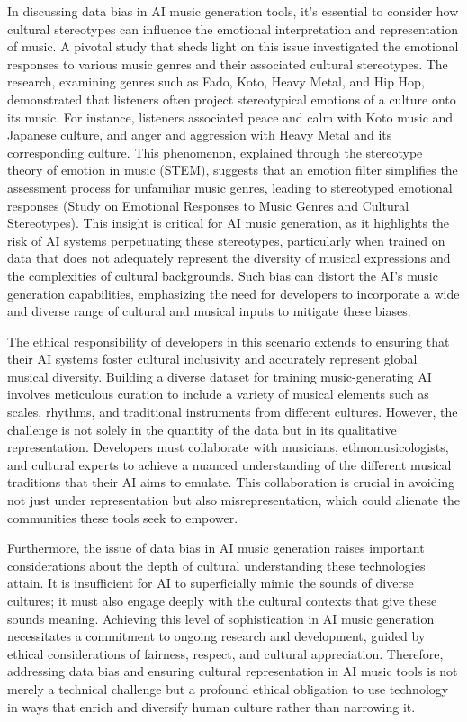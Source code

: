 \documentclass[10pt,twocolumn]{article}
\begin{document}
In discussing data bias in AI music generation tools, it's essential to consider how cultural stereotypes can influence the emotional interpretation and representation of music. A pivotal study \cite{stereotype} that sheds light on this issue investigated the emotional responses to various music genres and their associated cultural stereotypes. The research, examining genres such as Fado, Koto, Heavy Metal, and Hip Hop, demonstrated that listeners often project stereotypical emotions of a culture onto its music. For instance, listeners associated peace and calm with Koto music and Japanese culture, and anger and aggression with Heavy Metal and its corresponding culture. This phenomenon, explained through the stereotype theory of emotion in music (STEM), suggests that an emotion filter simplifies the assessment process for unfamiliar music genres, leading to stereotyped emotional responses (Study on Emotional Responses to Music Genres and Cultural Stereotypes). This insight is critical for AI music generation, as it highlights the risk of AI systems perpetuating these stereotypes, particularly when trained on data that does not adequately represent the diversity of musical expressions and the complexities of cultural backgrounds. Such bias can distort the AI's music generation capabilities, emphasizing the need for developers to incorporate a wide and diverse range of cultural and musical inputs to mitigate these biases.

The ethical responsibility of developers in this scenario extends to ensuring that their AI systems foster cultural inclusivity and accurately represent global musical diversity. Building a diverse dataset for training music-generating AI involves meticulous curation to include a variety of musical elements such as scales, rhythms, and traditional instruments from different cultures. However, the challenge is not solely in the quantity of the data but in its qualitative representation. Developers must collaborate with musicians, ethnomusicologists, and cultural experts to achieve a nuanced understanding of the different musical traditions that their AI aims to emulate. This collaboration is crucial in avoiding not just under representation but also misrepresentation, which could alienate the communities these tools seek to empower.


Furthermore, the issue of data bias in AI music generation raises important considerations about the depth of cultural understanding these technologies attain. It is insufficient for AI to superficially mimic the sounds of diverse cultures; it must also engage deeply with the cultural contexts that give these sounds meaning. Achieving this level of sophistication in AI music generation necessitates a commitment to ongoing research and development, guided by ethical considerations of fairness, respect, and cultural appreciation. Therefore, addressing data bias and ensuring cultural representation in AI music tools is not merely a technical challenge but a profound ethical obligation to use technology in ways that enrich and diversify human culture rather than narrowing it.
\end{document}
